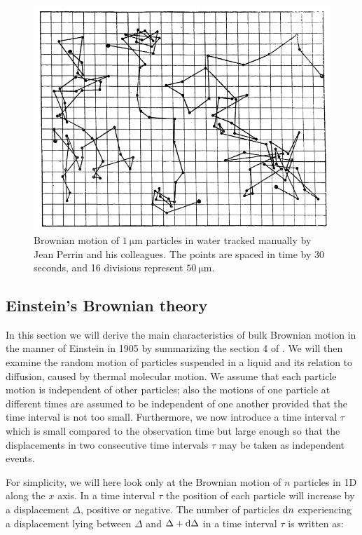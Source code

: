 \begin{figure}[h]
	\centering
	\includegraphics[scale=0.6]{02_body/chapter1/image/graph_perrin.png}
	\caption{Brownian motion of $1 ~ \mathrm{\mu m}$ particles in water tracked manually by Jean Perrin and his colleagues. The points are spaced in time by 30 seconds, and 16 divisions represent $50 ~ \mathrm{\mu m}$.}
	\label{fig:Perrin_Brownian}
\end{figure}

\subsection{Einstein's Brownian theory}

In this section we will derive the main characteristics of bulk Brownian motion in the manner of Einstein in 1905 by summarizing the section 4 of \cite{einstein_uber_1905}. We will then examine  the random motion of particles suspended in a liquid and its relation to diffusion, caused by thermal molecular motion. We assume that each particle motion is independent of other particles; also the motions of one particle at different times are assumed to be independent of one another provided that the time interval is not too small. Furthermore, we now introduce a time interval $\tau$ which is small compared to the observation time but large enough so that  the displacements in two consecutive time intervals $\tau$ may be taken as independent events. 

For simplicity, we will here look only at the Brownian motion of $n$ particles in 1D along the $x$ axis. In a time interval $\tau$ the position of each particle will increase by a displacement $\Delta$, positive or negative. The number of particles $\textnormal{d}n$ experiencing a displacement lying between $\Delta$ and $\Delta + \textnormal{d}\Delta$ in a time interval $\tau$ is written as:

